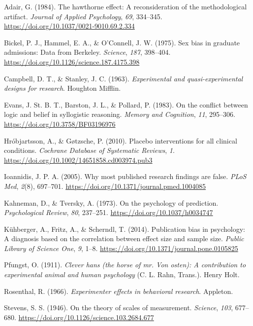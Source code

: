 \documentclass[
  a4paper,
]{book}
\newlength{\cslhangindent}
\newlength{\cslentryspacingunit} %
\newenvironment{CSLReferences}[2] %
 {%
  \setlength{\parindent}{0pt}
  \ifodd #1
  \let\oldpar\par
  \def\par{\hangindent=\cslhangindent\oldpar}
  \fi
  \setlength{\parskip}{#2\cslentryspacingunit}
 }%
 {}
\begin{document}
\hypertarget{refs}{}
\begin{CSLReferences}{1}{0}
\leavevmode{}%
Adair, G. (1984). The hawthorne effect: A reconsideration of the
methodological artifact. \emph{Journal of Applied Psychology},
\emph{69}, 334--345. \url{https://doi.org/10.1037/0021-9010.69.2.334}

\leavevmode{}%
Bickel, P. J., Hammel, E. A., \& O'Connell, J. W. (1975). Sex bias in
graduate admissions: Data from {B}erkeley. \emph{Science}, \emph{187},
398--404. \url{https://doi.org/10.1126/science.187.4175.398}

\leavevmode{}%
Campbell, D. T., \& Stanley, J. C. (1963). \emph{Experimental and
quasi-experimental designs for research}. Houghton Mifflin.

\leavevmode{}%
Evans, J. St. B. T., Barston, J. L., \& Pollard, P. (1983). On the
conflict between logic and belief in syllogistic reasoning. \emph{Memory
and Cognition}, \emph{11}, 295--306.
\url{https://doi.org/10.3758/BF03196976}

\leavevmode{}%
Hróbjartsson, A., \& Gøtzsche, P. (2010). Placebo interventions for all
clinical conditions. \emph{Cochrane Database of Systematic Reviews},
\emph{1}. \url{https://doi.org/10.1002/14651858.cd003974.pub3}

\leavevmode{}%
Ioannidis, J. P. A. (2005). Why most published research findings are
false. \emph{PLoS Med}, \emph{2}(8), 697--701.
\url{https://doi.org/10.1371/journal.pmed.1004085}

\leavevmode{}%
Kahneman, D., \& Tversky, A. (1973). On the psychology of prediction.
\emph{Psychological Review}, \emph{80}, 237--251.
\url{https://doi.org/10.1037/h0034747}

\leavevmode{}%
Kühberger, A., Fritz, A., \& Scherndl, T. (2014). Publication bias in
psychology: A diagnosis based on the correlation between effect size and
sample size. \emph{Public Library of Science One}, \emph{9}, 1--8.
\url{https://doi.org/10.1371/journal.pone.0105825}

\leavevmode{}%
Pfungst, O. (1911). \emph{Clever hans (the horse of mr. Von osten): A
contribution to experimental animal and human psychology} (C. L. Rahn,
Trans.). Henry Holt.

\leavevmode{}%
Rosenthal, R. (1966). \emph{Experimenter effects in behavioral
research}. Appleton.

\leavevmode{}%
Stevens, S. S. (1946). On the theory of scales of measurement.
\emph{Science}, \emph{103}, 677--680.
\url{https://doi.org/10.1126/science.103.2684.677}

\end{CSLReferences}
\end{document}
